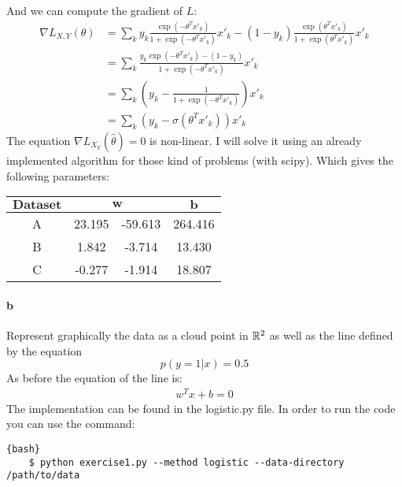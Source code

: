 \documentclass{article}
\begin{document}
And we can compute the gradient of $L$:
\begin{equation*}
    \begin{aligned}
        \nabla L_{X,Y}(\theta) & = \sum_k y_k \frac{\exp(-\theta^T x'_k)}{ 1 + \exp(-\theta^T x'_k)} x'_k - (1-y_k) \frac{\exp(\theta^T x'_k)}{ 1 + \exp(\theta^T x'_k)} x'_k \\
                               & = \sum_k \frac{y_k \exp(-\theta^T x'_k) - (1- y_k)}{ 1 + \exp(-\theta^T x'_k)} x'_k                                                          \\
                               & = \sum_k (y_k - \frac{1}{1 + \exp(-\theta^T x'_k)}) x'_k                                                                                     \\
                               & = \sum_k (y_k - \sigma(\theta^T x'_k)) x'_k
    \end{aligned}
\end{equation*}
The equation $\boxed{\nabla L_{X_Y}(\widehat\theta) = 0}$ is non-linear.
I will solve it using an already implemented algorithm for those kind of problems (with scipy). Which gives the following parameters:
\begin{tabular}{| c || c | c | c |}
    \hline
    $\mathbf{Dataset}$ & \multicolumn{2}{|c|}{$\mathbf{w}$} & $\mathbf{b}$           \\
    \hline
    A                  & 23.195                             & -59.613      & 264.416 \\
    \hline
    B                  & 1.842                              & -3.714       & 13.430  \\
    \hline
    C                  & -0.277                             & -1.914       & 18.807  \\
    \hline
\end{tabular}



\paragraph{b} Represent graphically the data as a cloud point in $\mathbb{R}^2$ as well as the line defined by the equation
\begin{equation*}
    p(y=1|x)=0.5
\end{equation*}
As before the equation of the line is:
\begin{equation*}
    \begin{aligned}w^Tx + b = 0
    \end{aligned}
\end{equation*}
The implementation can be found in the logistic.py file. In order to run the code you can use the command:
\begin{lstlisting}{bash}
    $ python exercise1.py --method logistic --data-directory /path/to/data
\end{lstlisting}
\end{document}
